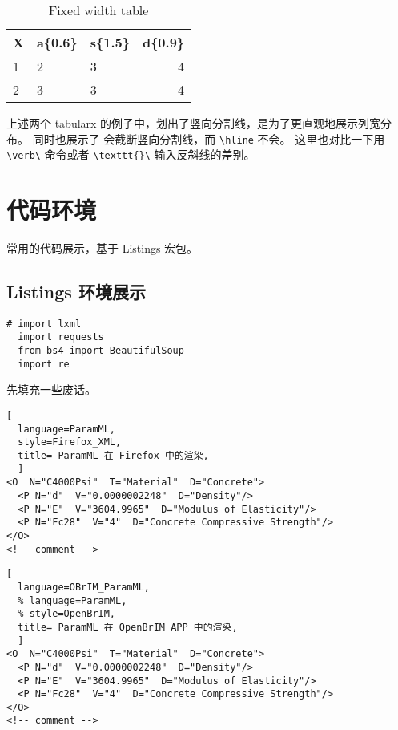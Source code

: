 \documentclass[../Main/thesis]{subfiles}
\begin{document}
\begin{table}[htbp]
  \centering
  \caption{Fixed width table}
  \begin{tabularx}{\linewidth}{X|a{0.6}|s{1.5}|d{0.9}}
    \toprule[1.5pt]
    X & a\{0.6\} & s\{1.5\} & d\{0.9\} \\ %
     & 2 & 3 & 4 \\
    2 & 3 & 3 & 4 \\
    \bottomrule[1.5pt]
  \end{tabularx}
  \end{table}

上述两个 tabularx 的例子中，划出了竖向分割线，是为了更直观地展示列宽分布。
同时也展示了  会截断竖向分割线，而 \verb|\hline| 不会。
这里也对比一下用 \verb|\verb\| 命令或者 \texttt{\textbackslash texttt\{\}\textbackslash} 输入反斜线的差别。

\section{代码环境}
\label{sec:code}

常用的代码展示，基于 Listings 宏包。

\subsection{Listings 环境展示}
\label{ssc:listings}

\begin{lstlisting}[style=monocolor,
  caption={first lst env},
  label={no label},
  name=测试第一个代码,
  language=PythonPlus]
  # import lxml
  import requests
  from bs4 import BeautifulSoup
  import re
\end{lstlisting}

先填充一些废话。\zhlipsum[8]

\begin{lstlisting}[
  language=ParamML,
  style=Firefox_XML,
  title= ParamML 在 Firefox 中的渲染,
  ]
<O  N="C4000Psi"  T="Material"  D="Concrete">
  <P N="d"  V="0.0000002248"  D="Density"/>
  <P N="E"  V="3604.9965"  D="Modulus of Elasticity"/>
  <P N="Fc28"  V="4"  D="Concrete Compressive Strength"/>
</O>
<!-- comment -->
\end{lstlisting}

\begin{lstlisting}[
  language=OBrIM_ParamML,
  % language=ParamML,
  % style=OpenBrIM,
  title= ParamML 在 OpenBrIM APP 中的渲染,
  ]
<O  N="C4000Psi"  T="Material"  D="Concrete">
  <P N="d"  V="0.0000002248"  D="Density"/>
  <P N="E"  V="3604.9965"  D="Modulus of Elasticity"/>
  <P N="Fc28"  V="4"  D="Concrete Compressive Strength"/>
</O>
<!-- comment -->
\end{lstlisting}
\end{document}
